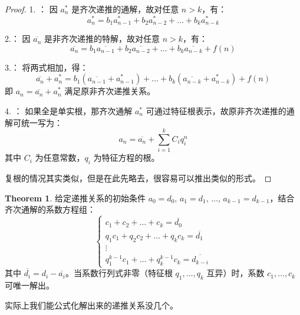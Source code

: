 \documentclass[oneside]{book}
\theoremstyle{definition}
\newtheorem{theorem}{Theorem}[section]
\begin{document}
\begin{proof}  
	1. ：  
	因 \( a_n^* \) 是齐次递推的通解，故对任意 \( n > k \)，有：  
	\[
	a_n^* = b_1 a_{n-1}^* + b_2 a_{n-2}^* + \dots + b_k a_{n-k}^*
	\]  
	
	2.：  
	因 \( \overline{a_n} \) 是非齐次递推的特解，故对任意 \( n > k \)，有：  
	\[
	\overline{a_n} = b_1 \overline{a_{n-1}} + b_2 \overline{a_{n-2}} + \dots + b_k \overline{a_{n-k}} + f(n)
	\]  
	
	3.：  
	将两式相加，得：  
	\[
	\overline{a_n} + a_n^* = b_1 \left( \overline{a_{n-1}} + a_{n-1}^* \right) + \dots + b_k \left( \overline{a_{n-k}} + a_{n-k}^* \right) + f(n)
	\]  
	即 \( a_n = \overline{a_n} + a_n^* \) 满足原非齐次递推关系。  
	
	4. ：  
	如果全是单实根，那齐次通解 \( a_n^* \) 可通过特征根表示，故原非齐次递推的通解可统一写为：  
	\[
	a_n = \overline{a_n} + \sum_{i=1}^k C_i q_i^n
	\]  
	其中 \( C_i \) 为任意常数，\( q_i \) 为特征方程的根。  
	
	复根的情况其实类似，但是在此先略去，很容易可以推出类似的形式。
\end{proof}  


\begin{theorem}
	给定递推关系的初始条件 \( a_0 = d_0,\, a_1 = d_1,\, \dots,\, a_{k-1} = d_{k-1} \)，结合齐次通解的系数方程组：  
	\[
	\begin{cases}
		c_1 + c_2 + \dots + c_k = \overline{d_0} \\
		q_1 c_1 + q_2 c_2 + \dots + q_k c_k = \overline{d_1} \\
		\vdots \\
		q_1^{k-1} c_1 + \dots + q_k^{k-1} c_k = \overline{d_{k-i}}
	\end{cases}
	\]  
	其中 \( \overline{d_i} = d_i - \overline{a_i} \)。当系数行列式非零（特征根 \( q_1,\dots,q_k \) 互异）时，系数 \( c_1,\dots,c_k \) 可唯一解出。  
\end{theorem}

实际上我们能公式化解出来的递推关系没几个。
\end{document}
